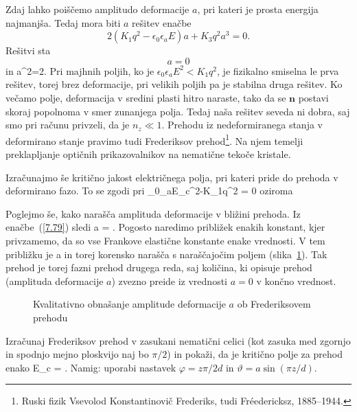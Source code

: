 Zdaj lahko poiščemo amplitudo deformacije $a$, pri kateri je prosta energija
najmanjša. Tedaj mora biti $a$ rešitev enačbe 
\begin{equation}
2(K_{1}q^{2}-\epsilon_{0}\epsilon_{a}E)a+K_{3}q^{2}a^{3}=0.
\label{7.78}
\end{equation}
 Rešitvi sta 
\begin{equation}
a=0
\end{equation}
in
\beq
a^{2}=2.
\label{7.79}
\eeq
 Pri majhnih poljih, ko je $\epsilon_{0}\epsilon_{a}E^2<K_{1}q^{2}$,
je fizikalno smiselna le prva rešitev, torej brez deformacije, pri velikih poljih pa je  
stabilna druga rešitev. Ko večamo polje, deformacija
v sredini plasti hitro naraste, tako da se $\mathbf{n}$ postavi skoraj
popolnoma v smer zunanjega polja. Tedaj naša rešitev seveda ni dobra,
saj smo pri računu privzeli, da je $n_{z}\ll1$. Prehodu iz nedeformiranega
stanja v deformirano stanje pravimo tudi Frederiksov prehod\footnote{Ruski fizik
Vsevolod Konstantinovič Frederiks, tudi Fr\'{e}edericksz, 1885--1944.}. Na njem
temelji preklapljanje optičnih prikazovalnikov na nematične tekoče kristale.

Izračunajmo še kritično jakost električnega polja, pri kateri pride do prehoda v deformirano fazo.
To se zgodi pri 
\beq
\epsilon_{0}\epsilon_{a}E_c^2-K_{1}q^{2} = 0
\eeq
oziroma

Poglejmo še, kako narašča amplituda deformacije v bližini prehoda. Iz enačbe~(\ref{7.79})
sledi 
\beq
a = .
\eeq
Pogosto naredimo približek enakih konstant, kjer privzamemo, da so vse Frankove 
elastične konstante enake vrednosti. V tem približku je 
\beq
a \approx {}
\eeq
in torej korensko narašča s naraščajočim poljem (slika~\ref{Fred}). Tak prehod je torej
fazni prehod drugega reda, saj količina, ki opisuje prehod (amplituda deformacije $a$)
zvezno preide iz vrednosti $a=0$ v končno vrednost. 
\begin{figure}[h]
\centering
\def\svgwidth{80truemm} 

\caption{Kvalitativno obnašanje amplitude deformacije $a$ ob Frederiksovem prehodu}
\label{Fred}
\end{figure}

\begin{definition}
Izračunaj Frederiksov prehod v zasukani nematični celici (kot zasuka med zgornjo in spodnjo 
mejno ploskvijo naj bo $\pi/2$) in pokaži, da je kritično polje za prehod enako
\beq
E_c =  
.
\eeq
Namig: uporabi nastavek $\varphi = z \pi/2d$ in $\vartheta = a \sin(\pi z/d)$. 
\end{definition}

